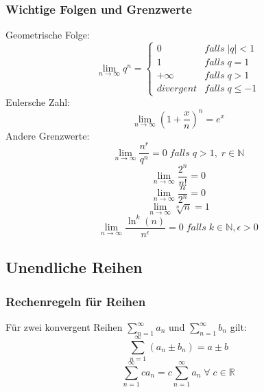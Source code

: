 \documentclass[a4paper,twocolumn,10pt]{article}
\begin{document}
\subsubsection{Wichtige Folgen und Grenzwerte}
Geometrische Folge:
\begin{equation*}
\lim\limits_{n\rightarrow\infty}q^n=\begin{cases}0 & falls\;|q|<1 \\ 1 & falls\; q=1 \\ +\infty & falls\;q>1 \\ divergent & falls\;q\leq -1\end{cases}
\end{equation*}
Eulersche Zahl:
\begin{equation*}
\lim\limits_{n\rightarrow\infty}\left(1+\frac{x}{n}\right)^n=e^x
\end{equation*}
Andere Grenzwerte:
\begin{equation*}
\lim\limits_{n\rightarrow\infty}\frac{n^r}{q^n}=0\;falls\;q>1,\;r\in\mathbb{N}
\end{equation*}
\begin{equation*}
\lim\limits_{n\rightarrow\infty}\frac{2^n}{n!}=0
\end{equation*}
\begin{equation*}
\lim\limits_{n\rightarrow\infty}\frac{n}{2^n}=0
\end{equation*}
\begin{equation*}
\lim\limits_{n\rightarrow\infty}\sqrt[n]{n}=1
\end{equation*}
\begin{equation*}
\lim\limits_{n\rightarrow\infty}\frac{\ln^k(n)}{n^{\epsilon}}=0\;falls\; k\in\mathbb{N},\epsilon>0
\end{equation*}

\subsection{Unendliche Reihen}

\subsubsection{Rechenregeln für Reihen}
Für zwei konvergent Reihen $\sum\limits_{n=1}^{\infty}a_n$ und $\sum\limits_{n=1}^{\infty}b_n$ gilt:
\begin{equation*}
\sum\limits_{n=1}^{\infty}(a_n\pm b_n)=a\pm b
\end{equation*}
\begin{equation*}
\sum\limits_{n=1}^{\infty}ca_n=c\sum\limits_{n=1}^{\infty}a_n\;\forall\;c\in\mathbb{R}
\end{equation*}
\end{document}
